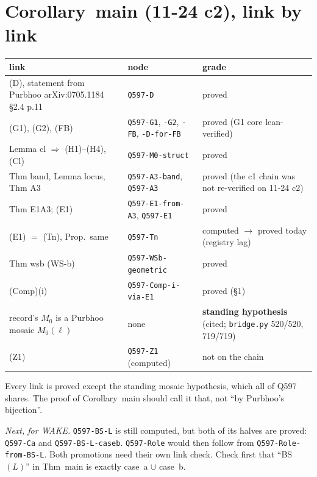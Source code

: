 \documentclass[11pt]{article}
\begin{document}
\section{Corollary~main (11-24 c2), link by link}
\begin{center}\small
\begin{tabular}{p{7.2cm}p{4.2cm}p{4.2cm}}\toprule
link & node & grade\\\midrule
(D), statement from Purbhoo arXiv:0705.1184 \S2.4 p.11 & \texttt{Q597-D} & proved\\
(G1), (G2), (FB) & \texttt{Q597-G1}, \texttt{-G2}, \texttt{-FB}, \texttt{-D-for-FB} & proved (G1 core lean-verified)\\
Lemma cl $\Rightarrow$ (H1)--(H4), (Cl) & \texttt{Q597-M0-struct} & proved\\
Thm band, Lemma locus, Thm A3 & \texttt{Q597-A3-band}, \texttt{Q597-A3} & proved (the c1 chain was not re-verified on 11-24 c2)\\
Thm E1A3; (E1) & \texttt{Q597-E1-from-A3}, \texttt{Q597-E1} & proved\\
(E1) $=$ (Tn), Prop.~same & \texttt{Q597-Tn} & computed $\to$ proved today (registry lag)\\
Thm wsb (WS-b) & \texttt{Q597-WSb-geometric} & proved\\
(Comp)(i) & \texttt{Q597-Comp-i-via-E1} & proved (\S1)\\
record's $M_0$ is a Purbhoo mosaic $M_0(\ell)$ & none & \textbf{standing hypothesis} (cited; \texttt{bridge.py} 520/520, 719/719)\\
(Z1) & \texttt{Q597-Z1} (computed) & not on the chain\\\bottomrule
\end{tabular}
\end{center}
Every link is proved except the standing mosaic hypothesis, which all of Q597 shares. The proof of Corollary~main should call it that, not ``by Purbhoo's bijection''.

\emph{Next, for WAKE.} \texttt{Q597-BS-L} is still computed, but both of its halves are proved: \texttt{Q597-Ca} and \texttt{Q597-BS-L-caseb}. \texttt{Q597-Role} would then follow from \texttt{Q597-Role-from-BS-L}. Both promotions need their own link check. Check first that ``BS$(L)$'' in Thm~main is exactly case~a $\cup$ case~b.
\end{document}
